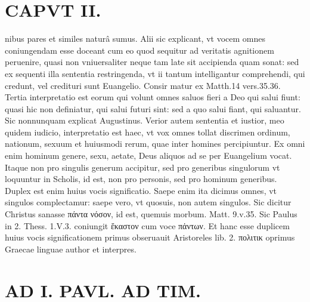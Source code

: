 \documentclass{article}
\begin{document}
\begin{pages}
\section*{CAPVT  II. }
\marginpar{[ p.55 ]}\pstart nibus pares et similes naturâ sumus. Alii sic explicant, vt vocem omnes coniungendam esse doceant cum eo quod sequitur ad veritatis agnitionem peruenire, quasi non vniuersaliter neque tam late sit accipienda quam sonat: sed ex sequenti illa sententia restringenda, vt ii tantum intelligantur comprehendi, qui credunt, vel credituri sunt Euangelio. Consir matur ex Matth.14 vers.35.36. Tertia interpretatio est eorum qui volunt omnes saluos fieri a Deo qui salui fiunt: quasi hic non definiatur, qui salui futuri sint: sed a quo salui fiant, qui saluantur. Sic nonnunquam explicat Augustinus. Verior autem sententia et iustior, meo quidem iudicio, interpretatio est haec, vt vox omnes tollat discrimen ordinum, nationum, sexuum et huiusmodi rerum, quae inter homines percipiuntur. Ex omni enim hominum genere, sexu, aetate, Deus aliquos ad se per Euangelium vocat. Itaque non pro singulis generum accipitur, sed pro generibus singulorum vt loquuntur in Scholis, id est, non pro personis, sed pro hominum generibus. Duplex est enim huius vocis significatio. Saepe enim ita dicimus omnes, vt singulos complectamur: saepe vero, vt quosuis, non autem singulos. Sic dicitur Christus sanasse πάντα νόσον, id est, quemuis morbum. Matt. 9.v.35. Sic Paulus in 2. Thess. 1.V.3. coniungit ἕκαστον cum voce πἀντων. Et hanc esse duplicem huius vocis significationem primus obseruauit Aristoreles lib.  2. πολιτικ oprimus Graecae linguae author et interpres.  \pend
\section*{AD I. PAVL. AD TIM. }
\marginpar{[ p.56 ]}\pstart {}
{}

\end{pages}
\end{document}
